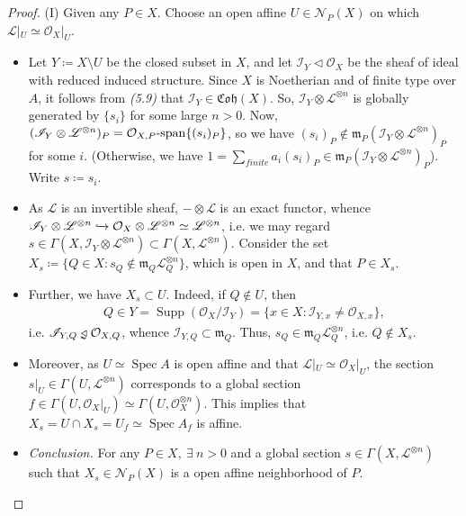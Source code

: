 \documentclass[11pt,a4paper,footinclude=true,headinclude=true]{scrbook} %
\newcommand{\trianglerightneq}{\mathrel{\ooalign{\raisebox{-0.5ex}{\reflectbox{\rotatebox{90}{$\nshortmid$}}}\cr$\triangleright$\cr}\mkern-3mu}}
\newcommand{\triangleleftneq}{\mathrel{\reflectbox{$\trianglerightneq$}}}
\DeclareMathOperator{\Supp}{Supp}
\DeclareMathOperator{\Spec}{Spec}
\newcommand{\II}{\mathscr{I}}
\newcommand{\LL}{\mathscr{L}}
\newcommand{\NN}{\mathcal{N}}
\newcommand{\OO}{\mathcal{O}}
\newcommand{\mm}{\mathfrak{m}}
\newcommand{\<}{\langle}
\newcommand{\>}{\rangle}
\newcommand{\spn}{\mathchar`-\mathrm{span}}
\newcommand{\coh}{\mathfrak{Coh}}
\begin{document}
\begin{proof}
    (I) Given any $P\in X$. Choose an open affine $U\in\NN_P(X)$ on which $\LL|_U\simeq\OO_X|_U$.
    \begin{itemize}
            \item Let $Y\coloneqq X\setminus U$ be the closed subset in $X$, and let $\II_Y\triangleleft\OO_X$ be the sheaf of ideal with reduced induced structure. Since $X$ is Noetherian and of finite type over $A$, it follows from \textit{(5.9)} that $\II_Y\in\coh(X)$. So, $\II_Y\otimes\LL^{\otimes n}$ is globally generated by $\{s_i\}$ for some large $n>0$. Now, $(\II_Y\otimes\LL^{\otimes n})_P=\OO_{X,P}\spn\{(s_i)_P\}$, so we have $(s_i)_P\notin\mm_P(\II_Y\otimes\LL^{\otimes n})_P$ for some $i$. (Otherwise, we have $1=\sum_{\textit{finite}}a_i(s_i)_P\in\mm_P(\II_Y\otimes\LL^{\otimes n})_P$). Write $s\coloneqq s_i$.
            \item As $\LL$ is an invertible sheaf, $-\otimes\LL$ is an exact functor, whence $\II_Y\otimes\LL^{\otimes n}\xhookrightarrow{}\OO_X\otimes\LL^{\otimes n}\simeq\LL^{\otimes n}$, i.e. we may regard $s\in\Gamma(X,\II_Y\otimes\LL^{\otimes n})\subset\Gamma(X,\LL^{\otimes n})$. Consider the set $X_s\coloneqq\{Q\in X:s_Q\notin\mm_Q\LL_Q^{\otimes n}\}$, which is open in $X$, and that $P\in X_s$.
            \item Further, we have $X_s\subset U$. Indeed, if $Q\notin U$, then 
            \begin{align*}
                Q\in Y=\Supp(\OO_X/\II_Y)=\{x\in X:\II_{Y,x}\neq\OO_{X,x}\},
            \end{align*}
            i.e. $\II_{Y,Q}\triangleleftneq\OO_{X,Q}$, whence $\II_{Y,Q}\subset\mm_Q$. Thus, $s_Q\in\mm_Q\LL_Q^{\otimes n}$, i.e. $Q\notin X_s$.
            \item Moreover, as $U\simeq\Spec A$ is open affine and that $\LL|_U\simeq\OO_X|_U$, the section $s|_U\in\Gamma(U,\LL^{\otimes n})$ corresponds to a global section $f\in\Gamma(U,\OO_X|_U)\simeq\Gamma(U,\OO_X^{\otimes n})$. This implies that $X_s=U\cap X_s=U_f\simeq\Spec A_f$ is affine.
            \item \textit{Conclusion.} For any $P\in X,\ \exists\ n>0$ and a global section $s\in\Gamma(X,\LL^{\otimes n})$ such that $X_s\in\NN_P(X)$ is a open affine neighborhood of $P$.
        \end{itemize}
        

\end{proof}
\end{document}
